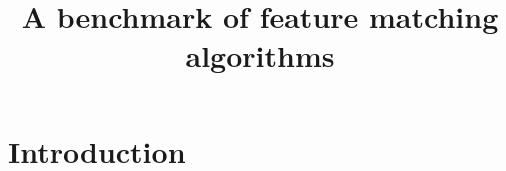 \documentclass{article}
\title{A benchmark of feature matching algorithms}
\author{}
\date{}
\begin{document}
\maketitle

\section{Introduction}









\end{document}
